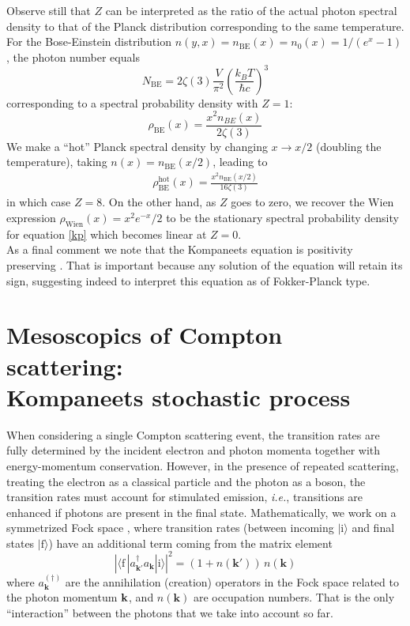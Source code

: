 \documentclass[a4paper,12pt,reqno,superscriptaddress,nofootinbib]{revtex4}
\theoremstyle{plain}
\theoremstyle{definition}
\theoremstyle{remark}
\newcommand{\0}{^{(0)}}
\newcommand{\1}{^{(1)}}
\newcommand{\2}{^{(2)}}
\begin{document}
Observe still that  $Z$
can be interpreted as the ratio of the actual photon spectral density to that 
of the Planck distribution corresponding to the same temperature.  For the 
Bose-Einstein distribution $n(y,x)= n_\text{BE}(x) = n_0(x) = 1 / (e^x - 1)$, 
the photon number equals
\[
N_\text{BE} = 2 \zeta(3) \frac{V}{\pi^2} \left( \frac{k_B T}{\hbar c} \right)^3
\]
corresponding to a spectral probability density with $Z = 1$:
\begin{equation}\label{eq:bespd}
\rho_\text{BE}(x) = \frac{x^2 n_{BE}(x)}{2\zeta(3)}
\end{equation}
We make a ``hot'' Planck spectral density by changing $x\rightarrow x/2$ (doubling the temperature), taking $n(x) = n_\text{BE}(x/2)$, leading to
\begin{eqnarray}\label{hott}
\rho_\text{BE}^\text{hot}(x) = \frac{x^2 n_\text{BE}(x/2)}{16\zeta(3)}
\end{eqnarray}
in which case $Z=8$.  On the other hand, as $Z$ goes to zero, we recover the Wien expression $\rho_\text{Wien}(x) = x^2 e^{-x}/2$ to be the stationary spectral probability density for equation \eqref{kp} which becomes linear at $Z=0$.\\


As a final comment we note that the Kompaneets equation is positivity preserving \cite{positivity}. That is important because any solution of the equation will retain its sign, suggesting indeed to interpret this equation as of Fokker-Planck type. 

\section{Mesoscopics of Compton scattering:\\ Kompaneets stochastic 
process}\label{ksp}	

When considering a single Compton scattering event, the transition rates are fully determined by the incident electron and photon momenta together with energy-momentum conservation. However, in the presence of repeated scattering, treating the electron as a classical particle and the photon as a boson, the transition rates must account for stimulated emission, \textit{i.e.}, transitions are enhanced if photons are present in the final state. Mathematically, we work on a symmetrized Fock space  \cite{kadanoff}, where transition rates (between incoming  $|\text{i}\rangle$ and final states $|\text{f}\rangle$) have an additional term coming from the matrix element
\begin{equation}
\left|\langle \text{f}\,| a^\dagger_{{\mathbf k'}}a_{\mathbf k}|\text{i}\rangle\right|^2 = (1+n({\mathbf k'}))\,n({\mathbf k})
\end{equation}
where $a^{(\dagger)}_{\mathbf k}$ are the annihilation (creation) operators in the Fock space  related to the photon momentum $\vb{k}$, and $n({\mathbf k})$ are occupation numbers.  That is the only ``interaction'' between the photons that we take into account so far.
\end{document}
